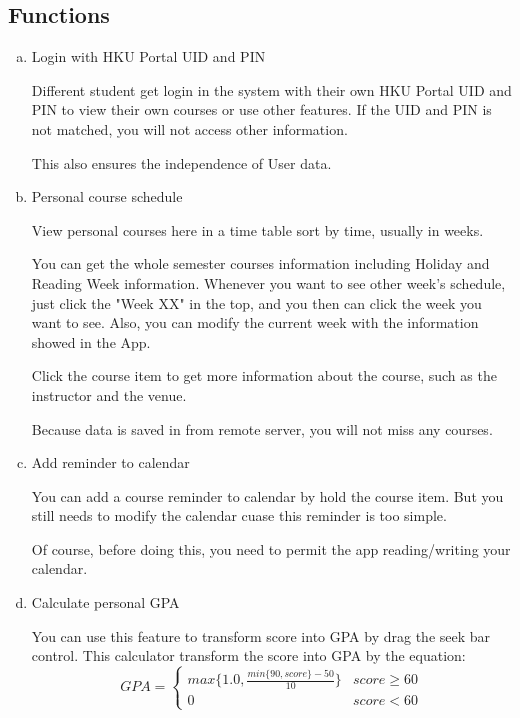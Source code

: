 \documentclass{article}
\begin{document}
    \subsection{Functions}
    \begin{enumerate}[a)]
    \item Login with HKU Portal UID and PIN
    
    Different student get login in the system with their own HKU
    Portal UID and PIN to view their own courses or use other features. 
    If the UID and PIN is not matched, you will not access other 
    information.

    This also ensures the independence of User data.
    
    \item Personal course schedule
    
    View personal courses here in a time table sort by time, 
    usually in weeks. 

    You can get the whole semester courses information 
    including Holiday and Reading Week information. 
    Whenever you want to see other week's schedule, just click 
    the "Week XX" in the top, and you then can click the week you 
    want to see. Also, you can modify the current week with the 
    information showed in the App.

    Click the course item to get more information about the course,
    such as the instructor and the venue. 
    
    Because data is saved in from remote server, 
    you will not miss any courses.

    \item Add reminder to calendar
    
    You can add a course reminder to calendar 
    by hold the course item. 
    But you still needs to modify the calendar 
    cuase this reminder is too simple.
    
    Of course, before doing this,
    you need to permit the app reading/writing your calendar.

    \item Calculate personal GPA
    
    You can use this feature to transform score into 
    GPA by drag the seek bar control.
    This calculator transform the score into GPA by the equation:
    $$GPA =
    \begin{cases}
        max\{1.0, \frac{min\{90, score\} - 50}{10} \} & {score \geq  60}\\
        0 & {score < 60}
    \end{cases}$$


\end{enumerate}
\end{document}
